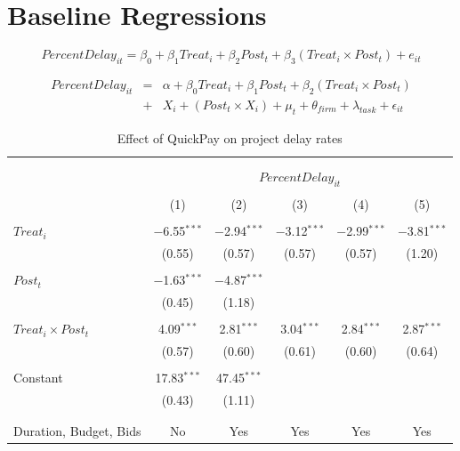 \documentclass[
]{article}
\begin{document}
\hypertarget{baseline-regressions}{%
\section{Baseline Regressions}\label{baseline-regressions}}

\[ PercentDelay_{it} = \beta_0 + \beta_1 Treat_i + \beta_2 Post_t + \beta_3 (Treat_i \times Post_t) + e_{it}\]

\[ \begin{aligned} PercentDelay_{it} &=& \alpha+\beta_0 Treat_i + \beta_1 Post_t + \beta_2 (Treat_i \times Post_t)\\
&+&  X_i + (Post_t \times X_i) + \mu_t + \theta_{firm} + \lambda_{task}+ \epsilon_{it}
\end{aligned}\]

\begin{table}[H] \centering 
  \caption{Effect of QuickPay on project delay rates} 
  \label{} 
\small 
\begin{tabular}{@{\extracolsep{-2pt}}lccccc} 
\\[-1.8ex]\hline 
\hline \\[-1.8ex] 
\\[-1.8ex] & \multicolumn{5}{c}{$PercentDelay_{it}$} \\ 
\\[-1.8ex] & (1) & (2) & (3) & (4) & (5)\\ 
\hline \\[-1.8ex] 
 $Treat_i$ & $-$6.55$^{***}$ & $-$2.94$^{***}$ & $-$3.12$^{***}$ & $-$2.99$^{***}$ & $-$3.81$^{***}$ \\ 
  & (0.55) & (0.57) & (0.57) & (0.57) & (1.20) \\ 
  & & & & & \\ 
 $Post_t$ & $-$1.63$^{***}$ & $-$4.87$^{***}$ &  &  &  \\ 
  & (0.45) & (1.18) &  &  &  \\ 
  & & & & & \\ 
 $Treat_i \times Post_t$ & 4.09$^{***}$ & 2.81$^{***}$ & 3.04$^{***}$ & 2.84$^{***}$ & 2.87$^{***}$ \\ 
  & (0.57) & (0.60) & (0.61) & (0.60) & (0.64) \\ 
  & & & & & \\ 
 Constant & 17.83$^{***}$ & 47.45$^{***}$ &  &  &  \\ 
  & (0.43) & (1.11) &  &  &  \\ 
  & & & & & \\ 
\hline \\[-1.8ex] 
Duration, Budget, Bids & No & Yes & Yes & Yes & Yes \\ 

\end{tabular}
\end{table}
\end{document}
